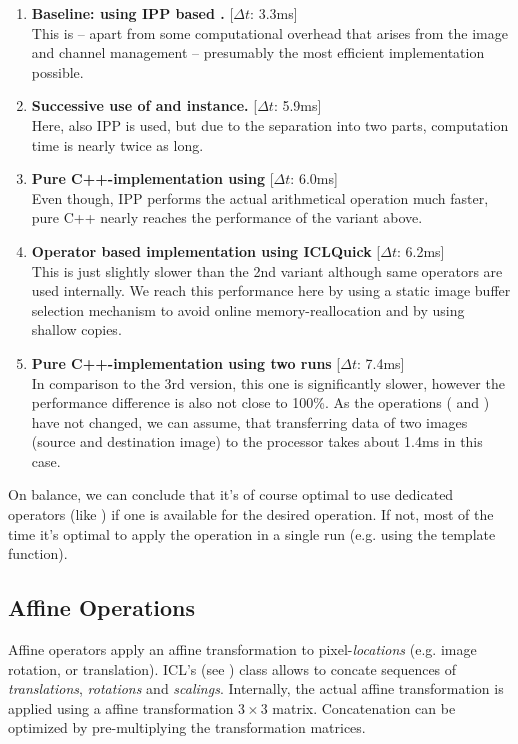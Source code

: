 \begin{enumerate}
\item \textbf{Baseline: using IPP based .} [$\Delta t$: 3.3ms]\\
This is -- apart from some computational overhead that arises from the image and channel management -- presumably the most efficient implementation possible. 
\item \textbf{Successive use of  and  instance.} [$\Delta t$: 5.9ms]\\
Here, also IPP is used, but due to the separation into two parts, computation time is nearly twice as long. 
\item \textbf{Pure C++-implementation using } [$\Delta t$: 6.0ms]\\
Even though, IPP performs the actual arithmetical operation much faster, pure C++ nearly reaches the performance of the variant above. 
\item \textbf{Operator based implementation using ICLQuick} [$\Delta t$: 6.2ms]\\
This is just slightly slower than the 2nd variant although same operators are used internally. We reach this performance here by using a static image buffer selection mechanism to avoid online memory-reallocation and by using shallow copies.
\item \textbf{Pure C++-implementation using two runs} [$\Delta t$: 7.4ms]\\
In comparison to the 3rd version, this one is significantly slower, however the performance difference is also not close to 100\%. As the operations (\icode{-} and ) have not changed, we can assume, that transferring data of two images (source and destination image) to the processor takes about 1.4ms in this case. 
\end{enumerate}

On balance, we can conclude that it's of course optimal to use dedicated operators (like ) if one is available for the desired operation. If not, most of the time it's optimal to apply the operation in a single run (e.g. using the  template function).

\subsection{Affine Operations\label{subsec:affine-ops}}
Affine operators apply an affine transformation to pixel-\emph{locations} (e.g. image rotation, or translation). ICL's  (see ) class allows to concate sequences of \emph{translations}, \emph{rotations} and \emph{scalings}. Internally, the actual affine transformation is applied using a affine transformation $3 \times{}3$ matrix. Concatenation can be optimized by pre-multiplying the transformation matrices.

